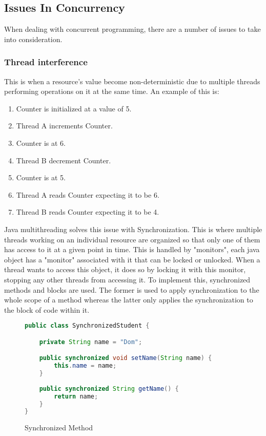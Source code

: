 \documentclass[]{report}
\begin{document}
\subsection{Issues In Concurrency}
When dealing with concurrent programming, there are a number of issues to take into consideration.

\subsubsection{Thread interference}
This is when a resource's value become non-deterministic due to multiple threads performing operations on it at the same time\cite{Thread Interference}. An example of this is:

\begin{enumerate}
	\item Counter is initialized at a value of 5.
	\item Thread A increments Counter.
	\item Counter is at 6.
	\item Thread B decrement Counter.
	\item Counter is at 5.
	\item Thread A reads Counter expecting it to be 6.
	\item Thread B reads Counter expecting it to be 4.	
\end{enumerate}

Java multithreading solves this issue with Synchronization. This is where multiple threads working on an individual resource are organized so that only one of them has access to it at a given point in time. This is handled by "monitors", each java object has a "monitor" associated with it that can be locked or unlocked. When a thread wants to access this object, it does so by locking it with this monitor, stopping any other threads from accessing it. To implement this, synchronized methods and blocks are used. The former is used to apply synchronization to the whole scope of a method whereas the latter only applies the synchronization to the block of code within it. \cite{Synchronization}

\begin{figure}[h!]
\caption{Synchronized Method}
\begin{lstlisting}[language=Java,frame=single]
public class SynchronizedStudent {

	private String name = "Dom";

	public synchronized void setName(String name) {
		this.name = name;
	}
	
	public synchronized String getName() {
		return name;
	}
}
\end{lstlisting}
\end{figure}
\end{document}
